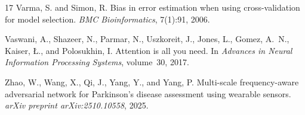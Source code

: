 \documentclass[pmlr]{jmlr}
\begin{document}
\begin{thebibliography}{17}
Varma, S. and Simon, R.
\newblock Bias in error estimation when using cross-validation for model
  selection.
\newblock \emph{BMC Bioinformatics}, 7(1):91, 2006.

Vaswani, A., Shazeer, N., Parmar, N., Uszkoreit, J., Jones, L., Gomez,
  A.~N., Kaiser, {\L}., and Polosukhin, I.
\newblock Attention is all you need.
\newblock In \emph{Advances in Neural Information Processing Systems},
  volume~30, 2017.

Zhao, W., Wang, X., Qi, J., Yang, Y., and Yang, P.
\newblock Multi-scale frequency-aware adversarial network for {Parkinson's}
  disease assessment using wearable sensors.
\newblock \emph{arXiv preprint arXiv:2510.10558}, 2025.

\end{thebibliography}
\end{document}
